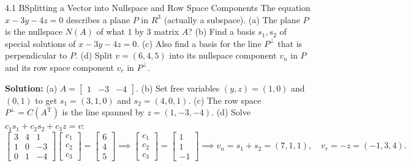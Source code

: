 \documentclass[11pt,a4paper,openany,oneside]{book}
\def\vect#1{#1}%
\def\mathbf#1{#1}%
\newcommand{\vect}[1]{\mathbf{#1}}
\newcommand{\T}{\mathrm{T}}
\numberwithin{equation}{chapter}
\begin{document}
\begin{example}{4.1 B}{Splitting a Vector into Nullspace and Row Space Components}
The equation $x - 3y - 4z = 0$ describes a plane $\mathbf{P}$ in $\mathbf{R}^3$ (actually a subspace).
(a) The plane $\mathbf{P}$ is the nullspace $N(A)$ of what $1$ by $3$ matrix $A$?
(b) Find a basis $\vect{s}_1, \vect{s}_2$ of special solutions of $x - 3y - 4z = 0$.
(c) Also find a basis for the line $\mathbf{P}^\perp$ that is perpendicular to $\mathbf{P}$.
(d) Split $\vect{v} = (6, 4, 5)$ into its nullspace component $\vect{v}_n$ in $\mathbf{P}$ and its row space component $\vect{v}_r$ in $\mathbf{P}^\perp$.
\end{example}
\textbf{Solution:}
(a) $A = \begin{bmatrix}1 & -3 & -4\end{bmatrix}$.
(b) Set free variables $(y,z)=(1,0)$ and $(0,1)$ to get $\vect{s}_1 = (3,1,0)$ and $\vect{s}_2 = (4,0,1)$.
(c) The row space $\mathbf{P}^\perp = C(A^\T)$ is the line spanned by $\vect{z} = (1,-3,-4)$.
(d) Solve $c_1\vect{s}_1 + c_2\vect{s}_2 + c_3\vect{z} = \vect{v}$:
\[
\begin{bmatrix} 3 & 4 & 1 \\ 1 & 0 & -3 \\ 0 & 1 & -4 \end{bmatrix} \begin{bmatrix} c_1 \\ c_2 \\ c_3 \end{bmatrix} = \begin{bmatrix} 6 \\ 4 \\ 5 \end{bmatrix} \implies \begin{bmatrix} c_1 \\ c_2 \\ c_3 \end{bmatrix} = \begin{bmatrix} 1 \\ 1 \\ -1 \end{bmatrix} \implies \vect{v}_n = \vect{s}_1 + \vect{s}_2 = (7,1,1), \quad \vect{v}_r = -\vect{z} = (-1,3,4).
\]
\end{document}
